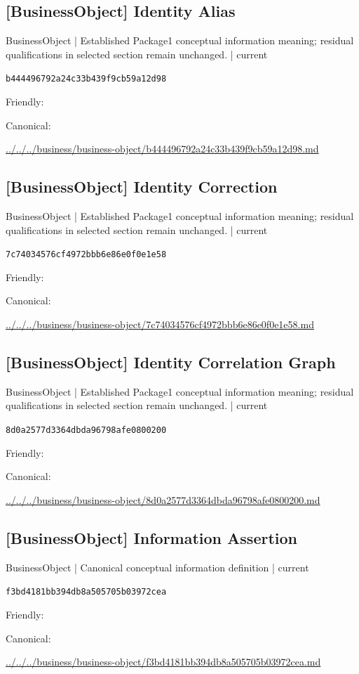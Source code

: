 \documentclass[10pt,a4paper]{article}
\begin{document}
\subsection*{[BusinessObject] Identity Alias}
{\small BusinessObject | Established Package1 conceptual information meaning; residual qualifications in selected section remain unchanged. | current}\par
\texttt{b444496792a24c33b439f9cb59a12d98}\par
Friendly: \par
Canonical: \par
{\footnotesize\url{../../../business/business-object/b444496792a24c33b439f9cb59a12d98.md}}\par
\subsection*{[BusinessObject] Identity Correction}
{\small BusinessObject | Established Package1 conceptual information meaning; residual qualifications in selected section remain unchanged. | current}\par
\texttt{7c74034576cf4972bbb6e86e0f0e1e58}\par
Friendly: \par
Canonical: \par
{\footnotesize\url{../../../business/business-object/7c74034576cf4972bbb6e86e0f0e1e58.md}}\par
\subsection*{[BusinessObject] Identity Correlation Graph}
{\small BusinessObject | Established Package1 conceptual information meaning; residual qualifications in selected section remain unchanged. | current}\par
\texttt{8d0a2577d3364dbda96798afe0800200}\par
Friendly: \par
Canonical: \par
{\footnotesize\url{../../../business/business-object/8d0a2577d3364dbda96798afe0800200.md}}\par
\subsection*{[BusinessObject] Information Assertion}
{\small BusinessObject | Canonical conceptual information definition | current}\par
\texttt{f3bd4181bb394db8a505705b03972cea}\par
Friendly: \par
Canonical: \par
{\footnotesize\url{../../../business/business-object/f3bd4181bb394db8a505705b03972cea.md}}\par
\end{document}
